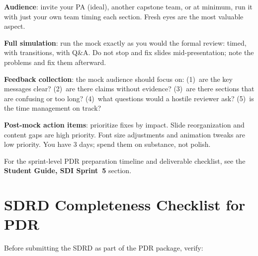 \textbf{Audience}: invite your PA (ideal), another capstone team, or at minimum, run it with just your own team timing each section. Fresh eyes are the most valuable aspect.

\textbf{Full simulation}: run the mock exactly as you would the formal review: timed, with transitions, with Q\&A. Do not stop and fix slides mid-presentation; note the problems and fix them afterward.

\textbf{Feedback collection}: the mock audience should focus on: (1)~are the key messages clear? (2)~are there claims without evidence? (3)~are there sections that are confusing or too long? (4)~what questions would a hostile reviewer ask? (5)~is the time management on track?

\textbf{Post-mock action items}: prioritize fixes by impact. Slide reorganization and content gaps are high priority. Font size adjustments and animation tweaks are low priority. You have 3 days; spend them on substance, not polish.



\begin{tipbox}
For the sprint-level PDR preparation timeline and deliverable checklist, see the \textbf{Student Guide, SDI Sprint~5} section.
\end{tipbox}

\section{SDRD Completeness Checklist for PDR}
Before submitting the SDRD as part of the PDR package, verify:

